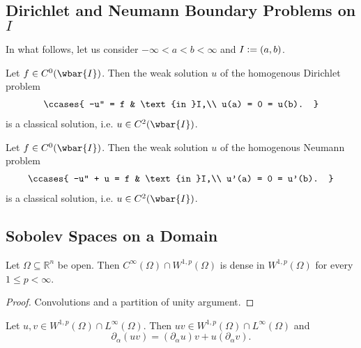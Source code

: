 \subsection*{Dirichlet and Neumann Boundary Problems on $I$}
In what follows, let us consider $-\infty < a < b < \infty$ and $I := \intoo{a,b}$.

\begin{proposition}
	Let $f \in C^0(\wbar{I})$. Then the weak solution $u$ of the homogenous Dirichlet problem
	\begin{align*}
		\ccases{
			-u'' = f & \text{in }I,\\
			u(a) = 0 = u(b).
		}
	\end{align*}
	\noindent is a classical solution, i.e. $u \in C^2(\wbar{I})$.
\end{proposition}

\begin{proposition}
	Let $f \in C^0(\wbar{I})$. Then the weak solution $u$ of the homogenous Neumann problem
	\begin{align*}
		\ccases{
			-u'' + u = f & \text{in }I,\\
			u'(a) = 0 = u'(b).
		}
	\end{align*}
	\noindent is a classical solution, i.e. $u \in C^2(\wbar{I})$.
\end{proposition}

\subsection*{Sobolev Spaces on a Domain}

\begin{theorem}
	\label{thm:Meyers-Serrin}
	Let $\Omega \subseteq \mathbb{R}^n$ be open. Then $C^\infty(\Omega) \cap W^{1,p}(\Omega)$ is dense in $W^{1,p}(\Omega)$ for every $1 \leq p < \infty$.
\end{theorem}

\begin{proof}
	Convolutions and a partition of unity argument.
\end{proof}

\begin{proposition}
	Let $u,v \in W^{1,p}(\Omega) \cap L^\infty(\Omega)$. Then $uv \in W^{1,p}(\Omega) \cap L^\infty(\Omega)$ and
	\begin{equation*}
		\partial_\alpha(uv) = (\partial_\alpha u) v + u (\partial_\alpha v).
	\end{equation*}
\end{proposition}

